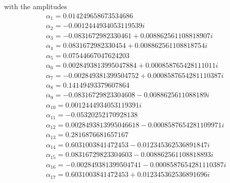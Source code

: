 \documentclass[prb,aps,amssymb,twocolumn,notitlepage]{revtex4-2}
\begin{document}
with the amplitudes
\begin{align}
&\alpha_{1}=0.014249658673534686\nonumber \\
&\alpha_{2}=-0.0012444934053119539 i\nonumber \\
&\alpha_{3}=-0.0831672982330461+0.008862561108818907i\nonumber \\
&\alpha_{4}=0.0831672982330454+0.008862561108818754i\nonumber \\
&\alpha_{5}=0.07544667047624203\nonumber \\
&\alpha_{6}=0.0028493813995047884+0.000858765428111011i\nonumber \\
&\alpha_{7}=-0.002849381399504752+0.0008587654281110387i\nonumber \\
&\alpha_{8}=0.14149493379607864\nonumber \\
&\alpha_{9}=-0.08316729823304608-0.0088625611088189i\nonumber \\
&\alpha_{10}=0.0012444934053119391i\nonumber \\
&\alpha_{11}=-0.05320252170928138\nonumber \\
&\alpha_{12}=0.0028493813995046618-0.0008587654281109971i\nonumber \\
&\alpha_{13}=0.2816876681657167\nonumber \\
&\alpha_{14}=0.6031003841472453-0.012345362536891847i\nonumber \\
&\alpha_{15}=0.08316729823304603-0.008862561108818893i\nonumber \\
&\alpha_{16}=-0.002849381399504741-0.0008587654281110387i\nonumber \\
&\alpha_{17}=0.6031003841472453+0.012345362536891696i\nonumber
\end{align}

\twocolumngrid


\end{document}
